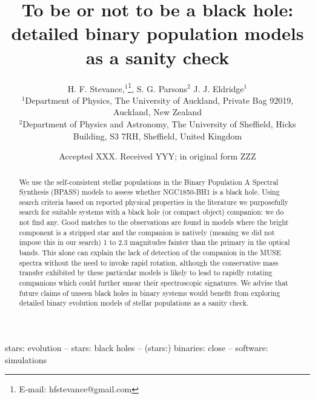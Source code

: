 \documentclass[fleqn,usenatbib]{mnras}
\title[To be or not to be a black hole: BPASS as a sanity check]{To be or not to be a black hole: detailed binary population models as a sanity check}
\author[H. F. Stevance]{
H. F. Stevance,$^{1}$\thanks{E-mail: hfstevance@gmail.com}, 
S. G. Parsons$^{2}$
J. J. Eldridge$^{1}$
\\
$^{1}$Department of Physics, The University of Auckland, Private Bag 92019, Auckland, New Zealand\\
$^{2}$Department of Physics and Astronomy, The University of Sheffield, Hicks Building, S3 7RH, Sheffield, United Kingdom\\
}
\date{Accepted XXX. Received YYY; in original form ZZZ}
\begin{document}
\label{firstpage}
\pagerange{\pageref{firstpage}--\pageref{lastpage}}
\maketitle

\begin{abstract}
We use the self-consistent stellar populations in the Binary Population A Spectral Synthesis (BPASS) models to assess whether NGC1850-BH1 is a black hole. Using search criteria based on reported physical properties in the literature we purposefully search for suitable systems with a black hole (or compact object) companion: we  do not find any. Good  matches to the observations are found in models where the bright component is a stripped star and the companion is natively (meaning we did not impose this in our search) 1 to 2.3 magnitudes fainter than the primary in the optical bands. This alone can explain the lack of detection of the companion in the MUSE spectra without the need to invoke rapid rotation, although the conservative mass transfer exhibited by these particular models is likely to lead to rapidly rotating companions which could further smear their spectroscopic signatures.
We advise that future claims of unseen black holes in binary systems would benefit from exploring detailed binary evolution models of stellar populations as a sanity check. %
\end{abstract}

\begin{keywords} stars: evolution -- stars: black holes -- (stars:) binaries: close -- software: simulations
\end{keywords}


\end{document}
